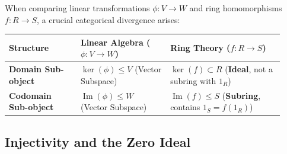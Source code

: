\begin{content}
When comparing linear transformations $\phi \colon V \to W$ and ring homomorphisms $f \colon R \to S$, a crucial categorical divergence arises:
\begin{center}
\begin{tabular}{@{}L{0.24\linewidth} L{0.30\linewidth} L{0.38\linewidth}@{}}
    \toprule
    \textbf{Structure} & \textbf{Linear Algebra ($\phi \colon V \to W$)} & \textbf{Ring Theory ($f \colon R \to S$)} \\
    \midrule
    \textbf{Domain Sub-object} & $\ker(\phi) \le V$ (Vector Subspace) & $\ker(f) \subset R$ (\textbf{Ideal}, not a subring with $1_R$) \\
    \textbf{Codomain Sub-object} & $\operatorname{Im}(\phi) \le W$ (Vector Subspace) & $\operatorname{Im}(f) \le S$ (\textbf{Subring}, contains $1_S = f(1_R)$) \\
    \bottomrule
\end{tabular}
\end{center}

\end{content}

\begin{hidden}
\end{hidden}

\subsection{Injectivity and the Zero Ideal}

